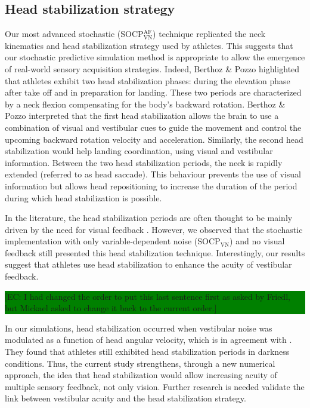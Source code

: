 \documentclass[10pt,letterpaper]{article}
\newcommand{\comEC}[1]{~\linebreak\noindent\colorbox{green}{\parbox{\dimexpr\columnwidth-1\fboxsep}{[EC: #1]}}}
\begin{document}
\subsection{Head stabilization strategy}\label{sec:head_stabilization}
Our most advanced stochastic (SOCP$_{\text{VN}}^{\text{AF}}$) technique replicated the neck kinematics and head stabilization strategy used by athletes.
This suggests that our stochastic predictive simulation method is appropriate to allow the emergence of real-world sensory acquisition strategies.
Indeed, Berthoz \& Pozzo \cite{berthoz1994head} highlighted that athletes exhibit two head stabilization phases: during the elevation phase after take off and in preparation for landing.
These two periods are characterized by a neck flexion compensating for the body's backward rotation.
Berthoz \& Pozzo \cite{berthoz1994head} interpreted that the first head stabilization allows the brain to use a combination of visual and vestibular cues to guide the movement and control the upcoming backward rotation velocity and acceleration.
Similarly, the second head stabilization would help landing coordination, using visual and vestibular information.
Between the two head stabilization periods, the neck is rapidly extended (referred to as head saccade).
This behaviour prevents the use of visual information but allows head repositioning to increase the duration of the period during which head stabilization is possible.

In the literature, the head stabilization periods are often thought to be mainly driven by the need for visual feedback \cite{sanders1994head, luis2008visual, heinen2011evidence}.
However, we observed that the stochastic implementation with only variable-dependent noise (SOCP$_{\text{VN}}$) and no visual feedback still presented this head stabilization technique.
Interestingly, our results suggest that athletes use head stabilization to enhance the acuity of vestibular feedback.
\comEC{I had changed the order to put this last sentence first as asked by Friedl, but Mickael asked to change it back to the current order.}
In our simulations, head stabilization occurred when vestibular noise was modulated as a function of head angular velocity, which is in agreement with \cite{davlin2004gymnasts}.
They found that athletes still exhibited head stabilization periods in darkness conditions.
Thus, the current study strengthens, through a new numerical approach, the idea that head stabilization would allow increasing acuity of multiple sensory feedback, not only vision. 
Further research is needed validate the link between vestibular acuity and the head stabilization strategy.
\end{document}
